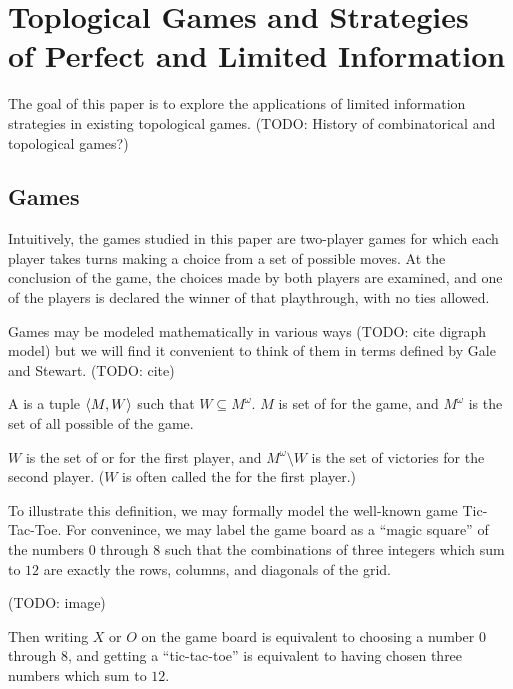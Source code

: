 
\chapter{Toplogical Games and Strategies\\ of Perfect and Limited Information}

The goal of this paper is to explore the applications of limited information
strategies in existing topological games. (TODO: History of combinatorical
and topological games?)

\section{Games}

Intuitively, the games studied in this paper are two-player games for which
each player takes turns making a choice from a set of possible moves. At
the conclusion of the game, the choices made by both players are examined,
and one of the players is declared the winner of that playthrough, with
no ties allowed.

Games may be modeled mathematically in various ways (TODO: cite digraph model)
but we will find it convenient to think of them in terms defined by
Gale and Stewart. (TODO: cite)

\begin{defn}
  A  is a tuple $\langle M,W\rangle$ such that 
  $W\subseteq M^{\omega}$. $M$ is set of  for
  the game, and $M^{\omega}$ is the set of all possible 
   of the game.

  $W$ is the set of  or  for the 
  first player, and $M^{\omega}\setminus W$ is the set of victories for the 
  second player. ($W$ is often called the  for the
  first player.)
\end{defn}

To illustrate this definition, we may formally model the well-known game 
Tic-Tac-Toe. For convenince, we may label the game board as a ``magic square''
of the numbers $0$ through $8$ such that the combinations of three integers
which sum to $12$ are exactly the rows, columns, and diagonals of the
grid. 

(TODO: image) 

Then writing $X$ or $O$ on
the game board is equivalent to choosing a number $0$ through $8$, and 
getting a ``tic-tac-toe'' is equivalent to having chosen three numbers which 
sum to $12$.

